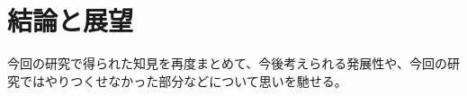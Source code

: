 \chapter{結論と展望}
\label{chap:conclusion}

今回の研究で得られた知見を再度まとめて、今後考えられる発展性や、今回の研究ではやりつくせなかった部分などについて思いを馳せる。
